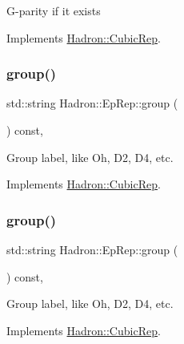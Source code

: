 G-\/parity if it exists 

Implements \mbox{\hyperlink{structHadron_1_1CubicRep_a52104e43266d1614c00bbd1c3b395458}{Hadron\+::\+Cubic\+Rep}}.

\mbox{\label{structHadron_1_1EpRep_a996c85eb1ef2784753bf82d2e15bc0ce}} 
\subsubsection{\texorpdfstring{group()}{group()}\hspace{0.1cm}{\footnotesize\ttfamily [1/3]}}
{\footnotesize\ttfamily std\+::string Hadron\+::\+Ep\+Rep\+::group (\begin{DoxyParamCaption}{ }\end{DoxyParamCaption}) const\hspace{0.3cm}{\ttfamily [inline]}, {\ttfamily [virtual]}}

Group label, like Oh, D2, D4, etc. 

Implements \mbox{\hyperlink{structHadron_1_1CubicRep_a0748f11ec87f387062c8e8981339a29c}{Hadron\+::\+Cubic\+Rep}}.

\mbox{\label{structHadron_1_1EpRep_a996c85eb1ef2784753bf82d2e15bc0ce}} 
\subsubsection{\texorpdfstring{group()}{group()}\hspace{0.1cm}{\footnotesize\ttfamily [2/3]}}
{\footnotesize\ttfamily std\+::string Hadron\+::\+Ep\+Rep\+::group (\begin{DoxyParamCaption}{ }\end{DoxyParamCaption}) const\hspace{0.3cm}{\ttfamily [inline]}, {\ttfamily [virtual]}}

Group label, like Oh, D2, D4, etc. 

Implements \mbox{\hyperlink{structHadron_1_1CubicRep_a0748f11ec87f387062c8e8981339a29c}{Hadron\+::\+Cubic\+Rep}}.

\mbox{\label{structHadron_1_1EpRep_a996c85eb1ef2784753bf82d2e15bc0ce}} 
